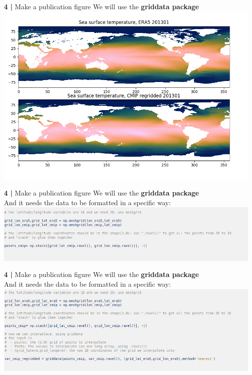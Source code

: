   
\begin{frame}{\textbf{4 |} Make a publication figure} 
    We will use the \textbf{griddata package}\\
    \includegraphics[scale=0.30]{images/script5_fig1.png}
\end{frame}

\begin{frame}{\textbf{4 |} Make a publication figure} 
    We will use the \textbf{griddata package}\\
        \vspace{0.3cm} 
    And it needs the data to be formatted in a specific way:
    \includegraphics[scale=0.35]{images/Script5_step2.png}
\end{frame}


\begin{frame}{\textbf{4 |} Make a publication figure} 
    We will use the \textbf{griddata package}\\
        \vspace{0.3cm} 
    And it needs the data to be formatted in a specific way:
    \includegraphics[scale=0.35]{images/Script5_step3.png}
\end{frame}



